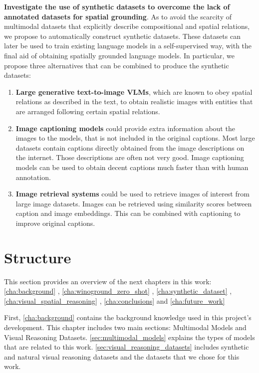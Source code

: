\textbf{Investigate the use of synthetic datasets to overcome the lack of annotated datasets for spatial grounding}. As to avoid the scarcity of multimodal datasets that explicitly describe compositional and spatial relations, we propose to automatically construct synthetic datasets. These datasets can later be used to train existing language models in a self-supervised way, with the final aid of obtaining spatially grounded language models. In particular, we propose three alternatives that can be combined to produce the synthetic datasets:
\begin{enumerate}
    \item \textbf{Large generative text-to-image VLMs}, which are known to obey spatial relations as described in the text, to obtain realistic images with entities that are arranged following certain spatial relations.
    \item \textbf{Image captioning models} could provide extra information about the images to the models, that is not included in the original captions. Most large datasets contain captions directly obtained from the image descriptions on the internet. Those descriptions are often not very good. Image captioning models can be used to obtain decent captions much faster than with human annotation.
    \item \textbf{Image retrieval systems} could be used to retrieve images of interest from large image datasets. Images can be retrieved using similarity scores between caption and image embeddings. This can be combined with captioning to improve original captions.
\end{enumerate}

\section{Structure} \label{sec:structure}

This section provides an overview of the next chapters in this work: \ref{cha:background} , \ref{cha:winoground_zero_shot} , \ref{cha:synthetic_dataset} , \ref{cha:visual_spatial_reasoning} , \ref{cha:conclusions}  and \ref{cha:future_work} 

First, \cref{cha:background} contains the background knowledge used in this project's development. This chapter includes two main sections: Multimodal Models and Visual Reasoning Datasets. \cref{sec:multimodal_models} explains the types of models that are related to this work. \cref{sec:visual_reasoning_datasets} includes synthetic and natural visual reasoning datasets and the datasets that we chose for this work.

